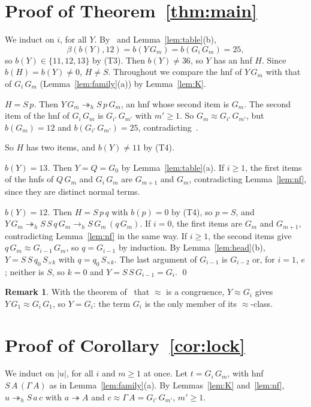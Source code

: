 \documentclass[11pt]{amsart}
\theoremstyle{definition}
\newtheorem{remark}[theorem]{Remark}
\newcommand{\red}{\twoheadrightarrow}
\newcommand{\hred}{\twoheadrightarrow_h}
\newcommand{\hstep}{\to_h}
\newcommand{\sz}[1]{\lvert#1\rvert}
\newcommand{\Sk}[1]{S_{\times#1}}
\begin{document}
\section{Proof of Theorem~\ref{thm:main}}

We induct on $i$, for all $Y$. By~\citep[Theorem~F]{s13} and Lemma~\ref{lem:table}(b),
\[
\beta(b(Y),12)=b(Y\,G_m)=b(G_i\,G_m)=25,
\] so $b(Y)\in\{11,12,13\}$ by (T3). Then $b(Y)\ne36$, so
$Y$ has an hnf $H$. Since $b(H)=b(Y)\ne0$, $H\ne S$. Throughout we compare the hnf of $Y\,G_m$
with that of $G_i\,G_m$ (Lemma~\ref{lem:family}(a)) by Lemma~\ref{lem:K}.

\emph{$H=S\,p$.} Then $Y\,G_m\hred S\,p\,G_m$, an hnf whose second item is $G_m$. The second item
of the hnf of $G_i\,G_m$ is $G_{i'}\,G_{m'}$ with $m'\ge1$. So $G_m\approx G_{i'}\,G_{m'}$, but
$b(G_m)=12$ and $b(G_{i'}\,G_{m'})=25$, contradicting~\citep[Theorem~F]{s13}.

So $H$ has two items, and $b(Y)\ne11$ by (T4).

\emph{$b(Y)=13$.} Then $Y=Q=G_0$ by Lemma~\ref{lem:table}(a). If $i\ge1$, the first items of the
hnfs of $Q\,G_m$ and $G_i\,G_m$ are $G_{m+1}$ and $G_m$, contradicting Lemma~\ref{lem:nf}, since
they are distinct normal terms.

\emph{$b(Y)=12$.} Then $H=S\,p\,q$ with $b(p)=0$ by (T4), so $p=S$, and
$Y\,G_m\hred S\,S\,q\,G_m\hstep S\,G_m\,(q\,G_m)$. If $i=0$, the first items are $G_m$ and
$G_{m+1}$, contradicting Lemma~\ref{lem:nf} in the same way. If $i\ge1$, the second items give
$q\,G_m\approx G_{i-1}\,G_m$, so $q=G_{i-1}$ by induction. By Lemma~\ref{lem:head}(b),
$Y=S\,S\,q_0\,\Sk k$ with $q=q_0\,\Sk k$. The last argument of $G_{i-1}$ is $G_{i-2}$ or, for
$i=1$, $e$; neither is $S$, so $k=0$ and $Y=S\,S\,G_{i-1}=G_i$. \qed

\begin{remark}\label{rem:congr}
With the theorem of~\citep[Theorem~C]{s13} that $\approx$ is a congruence, $Y\approx G_i$ gives
$Y\,G_1\approx G_i\,G_1$, so $Y=G_i$: the term $G_i$ is the only member of its $\approx$-class.
\end{remark}

\section{Proof of Corollary~\ref{cor:lock}}

We induct on $\sz u$, for all $i$ and $m\ge1$ at once. Let $t=G_i\,G_m$, with hnf
$S\,A\,(\Gamma\,A)$ as in Lemma~\ref{lem:family}(a). By Lemmas~\ref{lem:K} and~\ref{lem:nf},
$u\hred S\,a\,c$ with $a\red A$ and $c\approx\Gamma\,A=G_{i'}\,G_{m'}$, $m'\ge1$.
\end{document}
